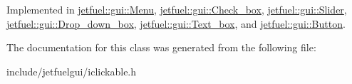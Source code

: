 Implemented in \hyperlink{classjetfuel_1_1gui_1_1Menu_a17298e1cec290db84ab4e3b1b13bd614}{jetfuel\+::gui\+::\+Menu}, \hyperlink{classjetfuel_1_1gui_1_1Check__box_a0e50420591dbd64f07f02f9ee7cec637}{jetfuel\+::gui\+::\+Check\+\_\+box}, \hyperlink{classjetfuel_1_1gui_1_1Slider_a8a1e83cfea8d65db34da7447dce9fb6f}{jetfuel\+::gui\+::\+Slider}, \hyperlink{classjetfuel_1_1gui_1_1Drop__down__box_ae3607405b7e3fe981da75f0529e0a7a1}{jetfuel\+::gui\+::\+Drop\+\_\+down\+\_\+box}, \hyperlink{classjetfuel_1_1gui_1_1Text__box_a088d62b01be4747ea2e7a6218516e036}{jetfuel\+::gui\+::\+Text\+\_\+box}, and \hyperlink{classjetfuel_1_1gui_1_1Button_ab80239583f2e515370a90771976c5265}{jetfuel\+::gui\+::\+Button}.



The documentation for this class was generated from the following file\+:\begin{DoxyCompactItemize}
\item 
include/jetfuelgui/iclickable.\+h\end{DoxyCompactItemize}

